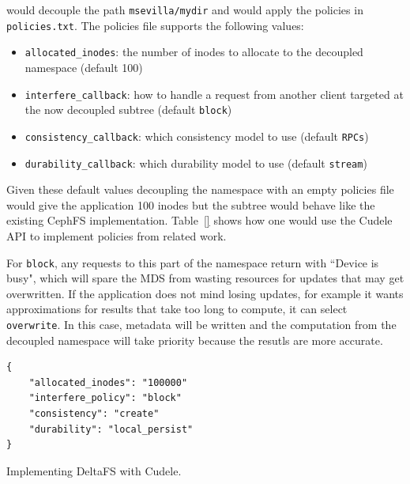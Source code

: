 would decouple the path \texttt{msevilla/mydir} and would apply the policies in
\texttt{policies.txt}. The policies file supports the following values:

\begin{itemize}

  \item \texttt{allocated\_inodes}: the number of inodes to allocate to the
  decoupled namespace (default 100)

  \item \texttt{interfere\_callback}: how to handle a request from another
  client targeted at the now decoupled subtree (default \texttt{block})

  \item \texttt{consistency\_callback}: which consistency model to use (default
  \texttt{RPCs})

  \item \texttt{durability\_callback}: which durability model to use (default
  \texttt{stream})

\end{itemize}

Given these default values decoupling the namespace with an empty policies file
would give the application 100 inodes but the subtree would behave like the
existing CephFS implementation. Table~\ref{} shows how one would use the Cudele
API to implement policies from related work. 


%

For \texttt{block}, any requests to this part of the namespace return with
``Device is busy", which will spare the MDS from wasting resources for updates
that may get overwritten. If the application does not mind losing updates, for
example it wants approximations for results that take too long to compute, it
can select \texttt{overwrite}. In this case, metadata will be written and the
computation from the decoupled namespace will take priority because the resutls
are more accurate.

\begin{listing}
\begin{verbatim}
{     
    "allocated_inodes": "100000"
    "interfere_policy": "block"
    "consistency": "create"
    "durability": "local_persist"
}
\end{verbatim}
\caption{Implementing DeltaFS with Cudele.}
\label{src:deltafs}
\end{listing}

